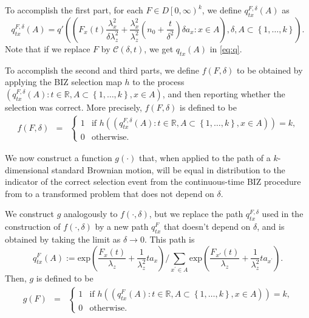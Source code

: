 \documentclass{wscpaperproc}
\theoremstyle{wsc}
\begin{document}
To accomplish the first part, for each $F\in D\left[0,\infty\right)^{k}$, 
we define $q_{tx}^{F,\delta}\left(A\right)$ as
\[
q_{tx}^{F,\delta}\left(A\right)=q'\left(\left(F_{x}\left(t\right)\frac{\lambda_{x}^{2}}{\delta\lambda_{z}^{2}}+\frac{\lambda_{x}^{2}}{\lambda_{z}^{2}}\left(n_{0}+\frac{t}{\delta^{2}}\right)\delta a_{x}:x\in A\right),\delta,A\subset\left\{ 1,\ldots,k\right\} \right).
\]
Note that if we replace $F$ by $\mathcal{C}\left(\delta,t\right)$,
we get $q_{tx}\left(A\right)$ in \eqref{eq:q}.   


To accomplish the second and third parts, we define
$f\left(F,\delta\right)$ to be obtained by applying the BIZ selection map $h$ to the process
$\left(q_{tx}^{F,\delta}\left(A\right):t\in\mathbb{R},A\subset\left\{ 1,\ldots,k\right\} ,x\in A\right)$, and then reporting whether the selection was correct.
More precisely, $f(F,\delta)$ is defined to be
\begin{eqnarray*}
f\left(F,\delta\right) & = & \begin{cases}
    1 & \text{if $h\left(\left(q_{tx}^{F,\delta}\left(A\right):t\in\mathbb{R},A\subset\left\{ 1,\ldots,k\right\} ,x\in A\right)\right) = k$,}\\
0 & \text{otherwise.}
\end{cases}
\end{eqnarray*}

We now construct a function $g(\cdot)$ that, when applied to the path of a $k$-dimensional standard Brownian motion, will be equal in distribution to the indicator of the correct selection event from the continuous-time BIZ procedure from  
to a transformed problem that does not depend on $\delta$.

We construct $g$ analogously to $f(\cdot,\delta)$, but we replace the path $q_{tx}^{F,\delta}$ used in the construction of $f(\cdot,\delta)$ by a new path $q_{tx}^{F}$ that doesn't depend on $\delta$, and is obtained by taking the limit as $\delta\to0$.  This path is
\[
q_{tx}^{F}\left(A\right):=\mbox{exp}\left(\frac{F_{x}\left(t\right)}{\lambda_{z}}+\frac{1}{\lambda_{z}^{2}}ta_{x}\right)/\sum_{x^{'}\in A}\mbox{exp}\left(\frac{F_{x'}\left(t\right)}{\lambda_{z}}+\frac{1}{\lambda_{z}^{2}}ta_{x^{'}}\right).
\]
Then, $g$ is defined to be
\begin{eqnarray*}
g\left(F\right) & = & \begin{cases}
    1 & \text{if $h\left(\left(q_{tx}^{F}\left(A\right):t\in\mathbb{R},A\subset\left\{ 1,\ldots,k\right\} ,x\in A\right)\right) = k$,}\\
0 & \text{otherwise.}
\end{cases}
\end{eqnarray*}
\end{document}
